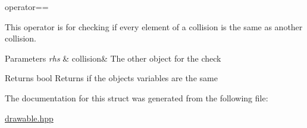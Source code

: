 operator== 

This operator is for checking if every element of a collision is the same as another collision.


\begin{DoxyParams}{Parameters}
{\em rhs} & collision\& The other object for the check \\
\hline
\end{DoxyParams}
\begin{DoxyReturn}{Returns}
bool Returns if the objects variables are the same 
\end{DoxyReturn}


The documentation for this struct was generated from the following file\+:\begin{DoxyCompactItemize}
\item 
\hyperlink{drawable_8hpp}{drawable.\+hpp}\end{DoxyCompactItemize}
